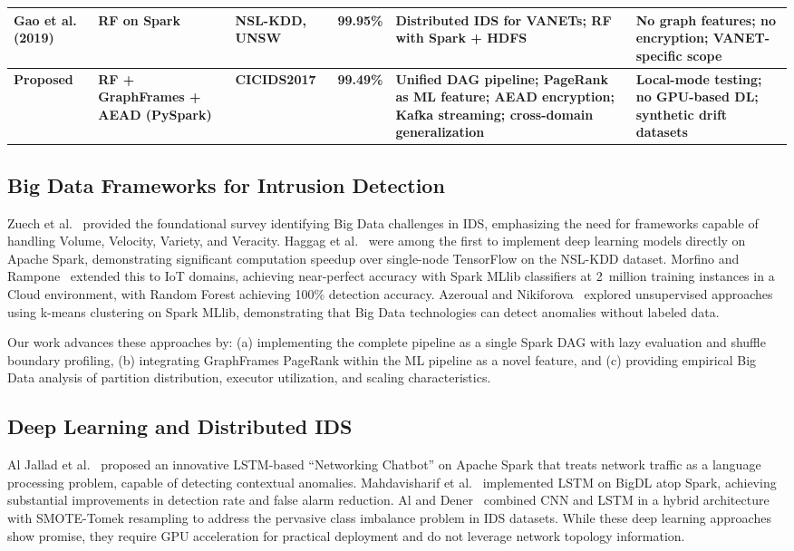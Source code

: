\documentclass[conference]{IEEEtran}
\begin{document}
\begin{table}[t]
\begin{adjustbox}{max width=\textwidth}
\begin{tabular}{p{2.8cm}p{2.2cm}p{1.8cm}p{1.2cm}p{4.5cm}p{4.5cm}}
\midrule
Gao et al.~\cite{b10} (2019) & RF on Spark & NSL-KDD, UNSW & 99.95\% & Distributed IDS for VANETs; RF with Spark + HDFS & No graph features; no encryption; VANET-specific scope \\
\midrule
\textbf{Proposed} & \textbf{RF + GraphFrames + AEAD (PySpark)} & \textbf{CICIDS2017} & \textbf{99.49\%} & \textbf{Unified DAG pipeline; PageRank as ML feature; AEAD encryption; Kafka streaming; cross-domain generalization} & \textbf{Local-mode testing; no GPU-based DL; synthetic drift datasets} \\
\bottomrule
\end{tabular}
\end{adjustbox}
\end{table}

\subsection{Big Data Frameworks for Intrusion Detection}

Zuech et al.~\cite{b1} provided the foundational survey identifying Big Data challenges in IDS, emphasizing the need for frameworks capable of handling Volume, Velocity, Variety, and Veracity. Haggag et al.~\cite{b2} were among the first to implement deep learning models directly on Apache Spark, demonstrating significant computation speedup over single-node TensorFlow on the NSL-KDD dataset. Morfino and Rampone~\cite{b3} extended this to IoT domains, achieving near-perfect accuracy with Spark MLlib classifiers at 2~million training instances in a Cloud environment, with Random Forest achieving 100\% detection accuracy. Azeroual and Nikiforova~\cite{b4} explored unsupervised approaches using k-means clustering on Spark MLlib, demonstrating that Big Data technologies can detect anomalies without labeled data.

Our work advances these approaches by: (a) implementing the complete pipeline as a single Spark DAG with lazy evaluation and shuffle boundary profiling, (b) integrating GraphFrames PageRank within the ML pipeline as a novel feature, and (c) providing empirical Big Data analysis of partition distribution, executor utilization, and scaling characteristics.

\subsection{Deep Learning and Distributed IDS}

Al Jallad et al.~\cite{b5} proposed an innovative LSTM-based ``Networking Chatbot'' on Apache Spark that treats network traffic as a language processing problem, capable of detecting contextual anomalies. Mahdavisharif et al.~\cite{b6} implemented LSTM on BigDL atop Spark, achieving substantial improvements in detection rate and false alarm reduction. Al and Dener~\cite{b7} combined CNN and LSTM in a hybrid architecture with SMOTE-Tomek resampling to address the pervasive class imbalance problem in IDS datasets. While these deep learning approaches show promise, they require GPU acceleration for practical deployment and do not leverage network topology information.
\end{document}
